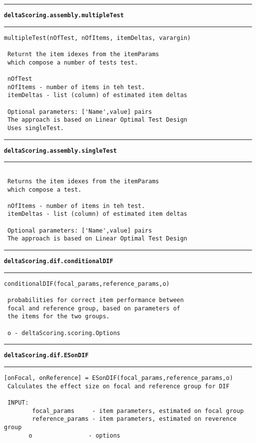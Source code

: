 \par\noindent\rule{\textwidth}{0.4pt}
{\bf\tt deltaScoring.assembly.multipleTest}
\par\noindent\rule{\textwidth}{0.4pt}
\begin{lstlisting}[style=Matlab-bw]
 multipleTest(nOfTest, nOfItems, itemDeltas, varargin)

 Returnt the item idexes from the itemParams
 which compose a number of tests test.

 nOfTest
 nOfItems - number of items in teh test.
 itemDeltas - list (column) of estimated item deltas

 Optional parameters: ['Name',value] pairs
 The approach is based on Linear Optimal Test Design
 Uses singleTest.
\end{lstlisting}
\par\noindent\rule{\textwidth}{0.4pt}
{\bf\tt deltaScoring.assembly.singleTest}
\par\noindent\rule{\textwidth}{0.4pt}
\begin{lstlisting}[style=Matlab-bw]

 Returns the item idexes from the itemParams
 which compose a test.
 
 nOfItems - number of items in teh test.
 itemDeltas - list (column) of estimated item deltas

 Optional parameters: ['Name',value] pairs
 The approach is based on Linear Optimal Test Design
\end{lstlisting}
\par\noindent\rule{\textwidth}{0.4pt}
{\bf\tt deltaScoring.dif.conditionalDIF}
\par\noindent\rule{\textwidth}{0.4pt}
\begin{lstlisting}[style=Matlab-bw]
 conditionalDIF(focal_params,reference_params,o)

 probabilities for correct item performance between
 focal and reference group, based on parameters of 
 the items for the two groups.
 
 o - deltaScoring.scoring.Options

\end{lstlisting}
\par\noindent\rule{\textwidth}{0.4pt}
{\bf\tt deltaScoring.dif.ESonDIF}
\par\noindent\rule{\textwidth}{0.4pt}
\begin{lstlisting}[style=Matlab-bw]
 [onFocal, onReference] = ESonDIF(focal_params,reference_params,o)
 Calculates the effect size on focal and reference group for DIF
 
 INPUT:
		focal_params 	 - item parameters, estimated on focal group
		reference_params - item parameters, estimated on reverence group
       o                - options
\end{lstlisting}
